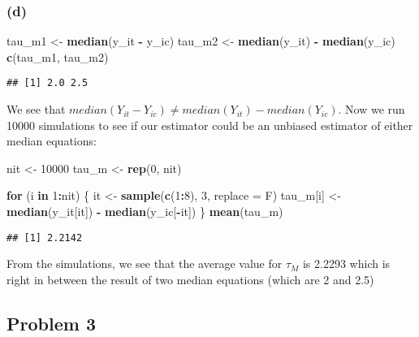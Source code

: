 \documentclass[]{article}
\newenvironment{Shaded}{\begin{snugshade}}{\end{snugshade}}
\newcommand{\ControlFlowTok}[1]{\textcolor[rgb]{0.13,0.29,0.53}{\textbf{#1}}}
\newcommand{\DataTypeTok}[1]{\textcolor[rgb]{0.13,0.29,0.53}{#1}}
\newcommand{\DecValTok}[1]{\textcolor[rgb]{0.00,0.00,0.81}{#1}}
\newcommand{\KeywordTok}[1]{\textcolor[rgb]{0.13,0.29,0.53}{\textbf{#1}}}
\newcommand{\NormalTok}[1]{#1}
\newcommand{\OperatorTok}[1]{\textcolor[rgb]{0.81,0.36,0.00}{\textbf{#1}}}
\newcommand{\StringTok}[1]{\textcolor[rgb]{0.31,0.60,0.02}{#1}}
\begin{document}
\hypertarget{d}{%
\subsubsection{(d)}\label{d}}

\begin{Shaded}
\begin{Highlighting}[]
\NormalTok{tau_m1 <-}\StringTok{ }\KeywordTok{median}\NormalTok{(y_it }\OperatorTok{-}\StringTok{ }\NormalTok{y_ic)}
\NormalTok{tau_m2 <-}\StringTok{ }\KeywordTok{median}\NormalTok{(y_it) }\OperatorTok{-}\StringTok{ }\KeywordTok{median}\NormalTok{(y_ic)}
\KeywordTok{c}\NormalTok{(tau_m1, tau_m2)}
\end{Highlighting}
\end{Shaded}

\begin{verbatim}
## [1] 2.0 2.5
\end{verbatim}

We see that
\(median(Y_{it} - Y_{ic}) \neq median(Y_{it}) - median(Y_{ic})\). Now we
run 10000 simulations to see if our estimator could be an unbiased
estimator of either median equations:

\begin{Shaded}
\begin{Highlighting}[]
\NormalTok{nit <-}\StringTok{ }\DecValTok{10000}
\NormalTok{tau_m <-}\StringTok{ }\KeywordTok{rep}\NormalTok{(}\DecValTok{0}\NormalTok{, nit)}

\ControlFlowTok{for}\NormalTok{ (i }\ControlFlowTok{in} \DecValTok{1}\OperatorTok{:}\NormalTok{nit) \{}
\NormalTok{  it <-}\StringTok{ }\KeywordTok{sample}\NormalTok{(}\KeywordTok{c}\NormalTok{(}\DecValTok{1}\OperatorTok{:}\DecValTok{8}\NormalTok{), }\DecValTok{3}\NormalTok{, }\DataTypeTok{replace =}\NormalTok{ F)}
\NormalTok{  tau_m[i] <-}\StringTok{ }\KeywordTok{median}\NormalTok{(y_it[it]) }\OperatorTok{-}\StringTok{ }\KeywordTok{median}\NormalTok{(y_ic[}\OperatorTok{-}\NormalTok{it])}
\NormalTok{\}}
\KeywordTok{mean}\NormalTok{(tau_m)}
\end{Highlighting}
\end{Shaded}

\begin{verbatim}
## [1] 2.2142
\end{verbatim}

From the simulations, we see that the average value for \(\tau_M\) is
2.2293 which is right in between the result of two median equations
(which are 2 and 2.5)

\hypertarget{problem-3}{%
\subsection{Problem 3}\label{problem-3}}
\end{document}
